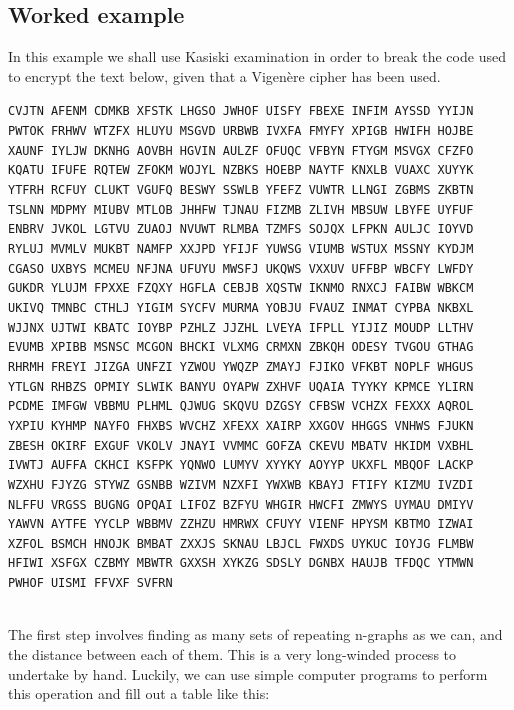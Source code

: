 \documentclass[Lau,binding=0.6cm,oneside]{sapthesis}
\begin{document}
\subsection{Worked example}
In this example we shall use Kasiski examination in order to break the code used to encrypt the text below, given that a Vigenère cipher has been used.

\begin{displayquote}{\small{\texttt{CVJTN AFENM CDMKB XFSTK LHGSO JWHOF UISFY FBEXE INFIM AYSSD YYIJN PWTOK FRHWV WTZFX HLUYU MSGVD URBWB IVXFA FMYFY XPIGB HWIFH HOJBE XAUNF IYLJW DKNHG AOVBH HGVIN AULZF OFUQC VFBYN FTYGM MSVGX CFZFO KQATU IFUFE RQTEW ZFOKM WOJYL NZBKS HOEBP NAYTF KNXLB VUAXC XUYYK YTFRH RCFUY CLUKT VGUFQ BESWY SSWLB YFEFZ VUWTR LLNGI ZGBMS ZKBTN TSLNN MDPMY MIUBV MTLOB JHHFW TJNAU FIZMB ZLIVH MBSUW LBYFE UYFUF ENBRV JVKOL LGTVU ZUAOJ NVUWT RLMBA TZMFS SOJQX LFPKN AULJC IOYVD RYLUJ MVMLV MUKBT NAMFP XXJPD YFIJF YUWSG VIUMB WSTUX MSSNY KYDJM CGASO UXBYS MCMEU NFJNA UFUYU MWSFJ UKQWS VXXUV UFFBP WBCFY LWFDY GUKDR YLUJM FPXXE FZQXY HGFLA CEBJB XQSTW IKNMO RNXCJ FAIBW WBKCM UKIVQ TMNBC CTHLJ YIGIM SYCFV MURMA YOBJU FVAUZ INMAT CYPBA NKBXL WJJNX UJTWI KBATC IOYBP PZHLZ JJZHL LVEYA IFPLL YIJIZ MOUDP LLTHV EVUMB XPIBB MSNSC MCGON BHCKI VLXMG CRMXN ZBKQH ODESY TVGOU GTHAG RHRMH FREYI JIZGA UNFZI YZWOU YWQZP ZMAYJ FJIKO VFKBT NOPLF WHGUS YTLGN RHBZS OPMIY SLWIK BANYU OYAPW ZXHVF UQAIA TYYKY KPMCE YLIRN PCDME IMFGW VBBMU PLHML QJWUG SKQVU DZGSY CFBSW VCHZX FEXXX AQROL YXPIU KYHMP NAYFO FHXBS WVCHZ XFEXX XAIRP XXGOV HHGGS VNHWS FJUKN ZBESH OKIRF EXGUF VKOLV JNAYI VVMMC GOFZA CKEVU MBATV HKIDM VXBHL IVWTJ AUFFA CKHCI KSFPK YQNWO LUMYV XYYKY AOYYP UKXFL MBQOF LACKP WZXHU FJYZG STYWZ GSNBB WZIVM NZXFI YWXWB KBAYJ FTIFY KIZMU IVZDI NLFFU VRGSS BUGNG OPQAI LIFOZ BZFYU WHGIR HWCFI ZMWYS UYMAU DMIYV YAWVN AYTFE YYCLP WBBMV ZZHZU HMRWX CFUYY VIENF HPYSM KBTMO IZWAI XZFOL BSMCH HNOJK BMBAT ZXXJS SKNAU LBJCL FWXDS UYKUC IOYJG FLMBW HFIWI XSFGX CZBMY MBWTR GXXSH XYKZG SDSLY DGNBX HAUJB TFDQC YTMWN PWHOF UISMI FFVXF SVFRN}}}
\end{displayquote}
\ \\
The first step involves finding as many sets of repeating n-graphs as we can, and the distance between each of them. This is a very long-winded process to undertake by hand. Luckily, we can use simple computer programs to perform this operation and fill out a table like this:\\
\end{document}
